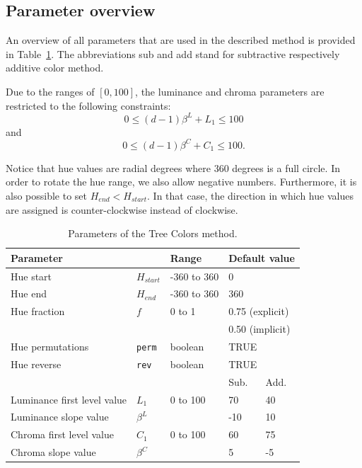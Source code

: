 \documentclass[journal]{vgtc}                %
\begin{document}
\subsection{Parameter overview}

An overview of all parameters that are used in the described method is provided in Table~\ref{table:param}. The abbreviations sub and add stand for subtractive respectively additive color method.

Due to the ranges of $[0, 100]$, the luminance and chroma parameters are restricted to the following constraints:
\begin{equation}
0 \leq (d-1)\beta^L + L_1 \leq 100
\end{equation}
and 
\begin{equation}
0 \leq (d-1)\beta^C + C_1 \leq 100.
\end{equation}

Notice that hue values are radial degrees where 360 degrees is a full circle. In order to rotate the hue range, we also allow negative numbers. Furthermore, it is also possible to set $H_{end} < H_{start}$. In that case, the direction in which hue values are assigned is counter-clockwise instead of clockwise.

\begin{table}[!htb]
\begin{footnotesize}
\begin{center}
\begin{tabular}{lllll}
\toprule
\multicolumn{2}{l}{Parameter    } & Range & \multicolumn{2}{l}{Default value} \\
\midrule
Hue start 				& $H_{start}$ &-360 to 360  & \multicolumn{2}{l}{0}      \\
Hue end   				& $H_{end}$ & -360 to 360 & \multicolumn{2}{l}{360}       \\
Hue fraction 				& $f$	& 0 to 1 & \multicolumn{2}{l}{0.75 (explicit)} \\
					&	&	 & \multicolumn{2}{l}{0.50 (implicit)} \\
Hue permutations 			& \texttt{perm} & boolean & \multicolumn{2}{l}{TRUE}      \\
Hue reverse   			& \texttt{rev} & boolean  & \multicolumn{2}{l}{TRUE}    \\
\cmidrule(r){4-5}
					&		&		& Sub. & Add. \\
\cmidrule(r){4-5}
Luminance first level value 	& $L_1$	& 0 to 100  & 70 & 40      \\
Luminance slope value 		& $\beta^L$ &       & -10  & 10      \\
Chroma first level value 		& $C_1$ &  0 to 100  & 60   & 75    \\
Chroma slope value 		& $\beta^C$ &     & 5   & -5    \\
\bottomrule
\end{tabular}
\end{center}
\end{footnotesize}
\caption{Parameters of the Tree Colors method.}\label{table:param}
\end{table}
\end{document}
